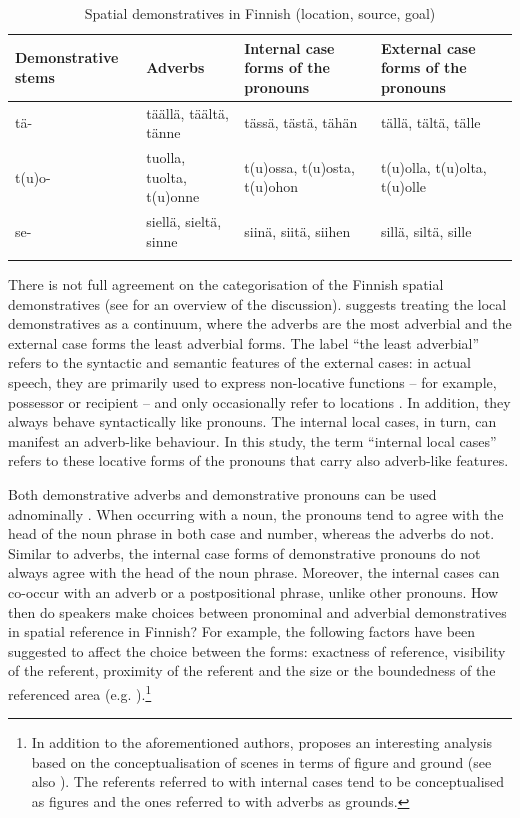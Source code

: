 \documentclass[output=paper,colorlinks,citecolor=brown]{langscibook}
\begin{document}
\begin{table}
\begin{tabularx}{\textwidth}{QQQQ}
\lsptoprule
{Demonstrative stems} & {Adverbs} & {Internal case forms of the pronouns} & {External case forms of the pronouns}\\
\midrule
{tä-} & {täällä, täältä, tänne} & {tässä, tästä, tähän} & {tällä, tältä, tälle}\\
\tablevspace
{t(u)o-} & {tuolla, tuolta, t(u)onne} & t(u)ossa, t(u)osta, t(u)ohon & t(u)olla, t(u)olta, t(u)olle\\
\tablevspace
{se-} & {siellä, sieltä, sinne} & {siinä, siitä, siihen} & {sillä, siltä, sille}\\
\lspbottomrule
\end{tabularx}
\caption{Spatial demonstratives in Finnish (location, source, goal)}
\label{tab:nahkola:1}
\end{table}

There is not full agreement on the categorisation of the Finnish spatial demonstratives (see \citealt{Laury1996} for an overview of the discussion). \citet{Laury1996} suggests treating the local demonstratives as a continuum, where the adverbs are the most adverbial and the external case forms the least adverbial forms. The label “the least adverbial” refers to the syntactic and semantic features of the external cases: in actual speech, they are primarily used to express non-locative functions – for example, possessor or recipient – and only occasionally refer to locations \citep{Laury1996,Laury1997}. In addition, they always behave syntactically like pronouns. The internal local cases, in turn, can manifest an adverb-like behaviour. In this study, the term “internal local cases” refers to these locative forms of the pronouns that carry also adverb-like features.

Both demonstrative adverbs and demonstrative pronouns can be used adnominally \citep{HakulinenEtAl2004}. When occurring with a noun, the pronouns tend to agree with the head of the noun phrase in both case and number, whereas the adverbs do not. Similar to adverbs, the internal case forms of demonstrative pronouns do not always agree with the head of the noun phrase. Moreover, the internal cases can co-occur with an adverb or a postpositional phrase, unlike other pronouns. How then do speakers make choices between pronominal and adverbial demonstratives in spatial reference in Finnish? For example, the following factors have been suggested to affect the choice between the forms: exactness of reference, visibility of the referent, proximity of the referent and the size or the boundedness of the referenced area (e.g. \citealt{Itkonen1966,Siitonen1979,Östman1995}).\footnote{In addition to the aforementioned authors, \citet{Laury1996} proposes an interesting analysis based on the conceptualisation of scenes in terms of figure and ground (see also \citealt{Talmy1983}). The referents referred to with internal cases tend to be conceptualised as figures and the ones referred to with adverbs as grounds.}
\end{document}
